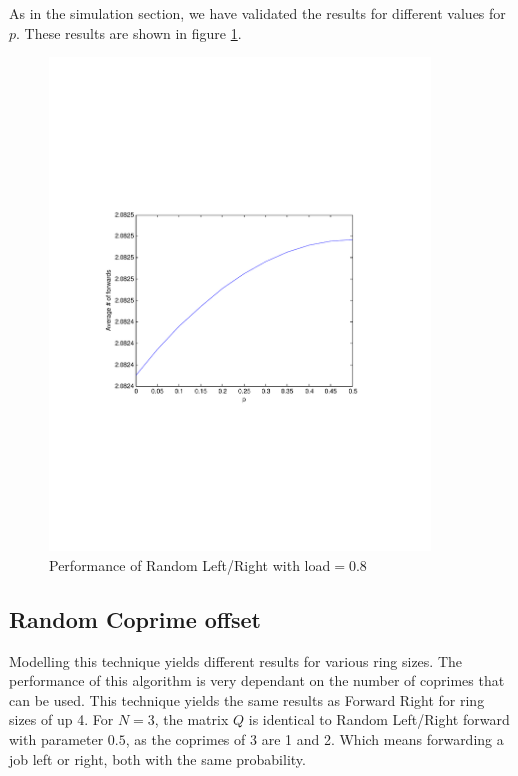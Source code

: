\documentclass[10pt,a4paper]{article}
\begin{document}
As in the simulation section, we have validated the results for different values for $p$. These results are shown in figure \ref{validrlrp}.

\begin{figure}[h!tb]
\centering
\includegraphics[clip=true, trim=9em 24em 9em 24em, width=0.9\textwidth]{resources/plotrandlrp.pdf}
\caption{Performance of Random Left/Right with load$=0.8$}
\label{validrlrp}
\end{figure}

\subsection{Random Coprime offset}
Modelling this technique yields different results for various ring sizes. The performance of this algorithm is very dependant on the number of coprimes that can be used. This technique yields the same results as Forward Right for ring sizes of up 4. For $N = 3$, the matrix $Q$ is identical to Random Left/Right forward with parameter $0.5$, as the coprimes of 3 are 1 and 2. Which means forwarding a job left or right, both with the same probability.
\end{document}
